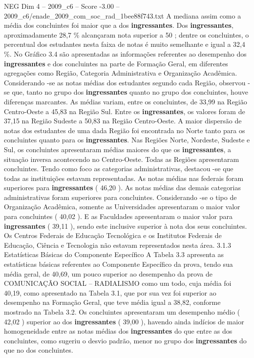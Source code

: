 \begin{textsample}{NEG Dim 4 – 2009\_c6 – Score -3.00 – 2009\_c6/enade\_2009\_com\_soc\_rad\_1bee88f743.txt}
A mediana assim como a média dos concluintes foi maior que a dos \textbf{ingressantes}.
Dos \textbf{ingressantes}, aproximadamente 28,7 \% alcançaram nota superior a 50 ; dentre os concluintes, o percentual dos estudantes nesta faixa de notas é muito semelhante e igual a 32,4 \%.
No Gráfico 3.4 são apresentadas as informações referentes ao desempenho dos \textbf{ingressantes} e dos concluintes na parte de Formação Geral, em diferentes agregações como Região, Categoria Administrativa e Organização Acadêmica.
Considerando -se as notas médias dos estudantes segundo cada Região, observou -se que, tanto no grupo dos \textbf{ingressantes} quanto no grupo dos concluintes, houve diferenças marcantes.
As médias variam, entre os concluintes, de 33,99 na Região Centro-Oeste a 45,83 na Região Sul.
Entre os \textbf{ingressantes}, os valores foram de 37,15 na Região Sudeste a 50,83 na Região Centro-Oeste.
A maior dispersão de notas dos estudantes de uma dada Região foi encontrada no Norte tanto para os concluintes quanto para os \textbf{ingressantes}.
Nas Regiões Norte, Nordeste, Sudeste e Sul, os concluintes apresentaram médias maiores do que os \textbf{ingressantes}, a situação inversa acontecendo no Centro-Oeste.
Todas as Regiões apresentaram concluintes.
Tendo como foco as categorias administrativas, destacou -se que todas as instituições estavam representadas.
As notas médias nas federais foram superiores para \textbf{ingressantes} ( 46,20 ).
As notas médias das demais categorias administrativas foram superiores para concluintes.
Considerando -se o tipo de Organização Acadêmica, somente as Universidades apresentaram o maior valor para concluintes ( 40,02 ).
E as Faculdades apresentaram o maior valor para \textbf{ingressantes} ( 39,11 ), sendo este inclusive superior à nota dos seus concluintes.
Os Centros Federais de Educação Tecnológica e os Institutos Federais de Educação, Ciência e Tecnologia não estavam representados nesta área. 3.1.3 Estatísticas Básicas do Componente Específico A Tabela 3.3 apresenta as estatísticas básicas referentes ao Componente Específico da prova, tendo sua média geral, de 40,69, um pouco superior ao desempenho da prova de COMUNICAÇÃO SOCIAL – RADIALISMO como um todo, cuja média foi 40,19, como apresentado na Tabela 3.1, que por sua vez foi superior ao desempenho na Formação Geral, que teve média igual a 38,82, conforme mostrado na Tabela 3.2.
Os concluintes apresentaram um desempenho médio ( 42,02 ) superior ao dos \textbf{ingressantes} ( 39,00 ), havendo ainda indícios de maior homogeneidade entre as notas médias dos \textbf{ingressantes} do que entre as dos concluintes, como sugeriu o desvio padrão, menor no grupo dos \textbf{ingressantes} do que no dos concluintes.

\end{textsample}
